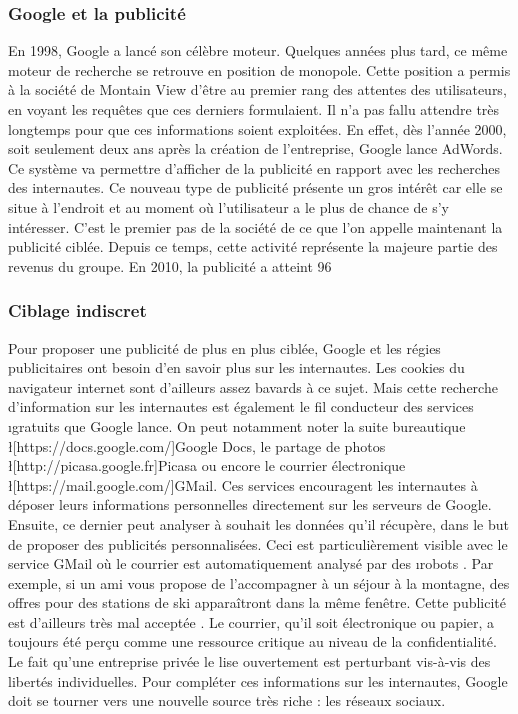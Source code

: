 \subsubsection{Google et la publicité}
En 1998, Google a lancé son célèbre moteur. Quelques années plus tard, ce même moteur de recherche se retrouve en position de monopole. Cette position a permis à la société de Montain View d'être au premier rang des attentes des utilisateurs, en voyant les requêtes que ces derniers formulaient. Il n'a pas fallu attendre très longtemps pour que ces informations soient exploitées. En effet, dès l'année 2000, soit seulement deux ans après la création de l'entreprise, Google lance AdWords. Ce système va permettre d'afficher de la publicité en rapport avec les recherches des internautes. Ce nouveau type de publicité présente un gros intérêt car elle se situe à l'endroit et au moment où l'utilisateur a le plus de chance de s'y intéresser. C'est le premier pas de la société de ce que l'on appelle maintenant la publicité ciblée. Depuis ce temps, cette activité représente la majeure partie des revenus du groupe. En 2010, la publicité a atteint 96%

\subsubsection{Ciblage indiscret}
Pour proposer une publicité de plus en plus ciblée, Google et les régies publicitaires ont besoin d'en savoir plus sur les internautes. Les cookies du navigateur internet sont d'ailleurs assez bavards à ce sujet. Mais cette recherche d'information sur les internautes est également le fil conducteur des services \i{gratuits} que Google lance. On peut notamment noter la suite bureautique \l[https://docs.google.com/]{Google Docs}, le partage de photos \l[http://picasa.google.fr]{Picasa} ou encore le courrier électronique \l[https://mail.google.com/]{GMail}. Ces services encouragent les internautes à déposer leurs informations personnelles directement sur les serveurs de Google. Ensuite, ce dernier peut analyser à souhait les données qu'il récupère, dans le but de proposer des publicités personnalisées. Ceci est particulièrement visible avec le service GMail où le courrier est automatiquement analysé par des \i{robots} \cite{pubGmail}. Par exemple, si un ami vous propose de l'accompagner à un séjour à la montagne, des offres pour des stations de ski apparaîtront dans la même fenêtre. Cette publicité est d'ailleurs très mal acceptée \cite{plainteGmail}. Le courrier, qu'il soit électronique ou papier, a toujours été perçu comme une ressource critique au niveau de la confidentialité. Le fait qu'une entreprise privée le lise ouvertement est perturbant vis-à-vis des libertés individuelles.
Pour compléter ces informations sur les internautes, Google doit se tourner vers une nouvelle source très riche : les réseaux sociaux.

